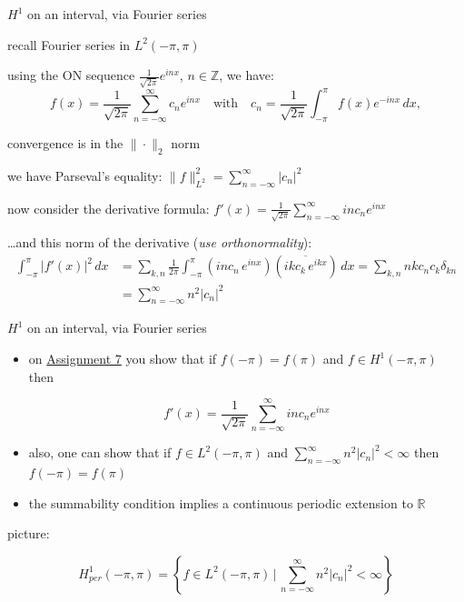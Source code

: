 \documentclass[10pt,
               svgnames,
               hyperref={colorlinks,
                         citecolor=DeepPink4,
                         linkcolor=FireBrick,
                         urlcolor=blue},
               usepdftitle=false]{beamer}
\newcommand{\RR}{\mathbb{R}}
\newcommand{\ZZ}{\mathbb{Z}}
\newcommand{\ds}{\displaystyle}
\begin{document}
\begin{frame}{$H^1$ on an interval, via Fourier series}

\begin{block}{{\small recall Fourier series in $L^2(-\pi,\pi)$}}
\begin{itemize}
{\small
\item using the ON sequence $\frac{1}{\sqrt{2\pi}} e^{inx}$, $n\in\ZZ$, we have:
 	$$f(x) = \frac{1}{\sqrt{2\pi}}\sum_{n=-\infty}^\infty c_n e^{inx} \quad \text{with} \quad c_n = \frac{1}{\sqrt{2\pi}} \int_{-\pi}^\pi f(x) e^{-inx}\,dx,$$
\item convergence is in the $\|\cdot\|_2$ norm
\item we have Parseval's equality: \quad $\ds \|f\|_{L^2}^2 = \sum_{n=-\infty}^\infty |c_n|^2$
}

\end{itemize}
\end{block}

\begin{itemize}
{\small
\item now consider the derivative formula: \quad $\ds f'(x) = \frac{1}{\sqrt{2\pi}} \sum_{n=-\infty}^\infty i n c_n e^{inx}$
\item \dots and this norm of the derivative (\emph{use orthonormality}):
\begin{align*}
\int_{-\pi}^\pi |f'(x)|^2\,dx &= \sum_{k,n} \frac{1}{2\pi} \int_{-\pi}^\pi (i n c_n\, e^{inx})(\overline{i k c_k\, e^{ikx}})\,dx = \sum_{k,n} n k c_n c_k \delta_{kn} \\
&= \sum_{n=-\infty}^\infty n^2 |c_n|^2
\end{align*}
}
\end{itemize}
\end{frame}


\begin{frame}{$H^1$ on an interval, via Fourier series}

\begin{itemize}
\item on \href{https://bueler.github.io/fa/assets/homework/S26/A7.pdf}{Assignment 7} you show that if $f(-\pi)=f(\pi)$ and $f\in H^1(-\pi,\pi)$ then

$$f'(x) = \frac{1}{\sqrt{2\pi}} \sum_{n=-\infty}^\infty i n c_n e^{inx}$$

\item also, one can show that if $f\in L^2(-\pi,\pi)$ and $\sum_{n=-\infty}^\infty n^2 |c_n|^2 < \infty$ then $f(-\pi)=f(\pi)$
\item the summability condition implies a continuous periodic extension to $\RR$
\end{itemize}

\medskip
picture:

\vspace{10mm}

\begin{definition}
    $$H_{per}^1(-\pi,\pi) = \left\{f\in L^2(-\pi,\pi) \,\Big|\, \sum_{n=-\infty}^\infty n^2 |c_n|^2 < \infty\right\}$$
\end{definition}
\end{frame}
\end{document}
